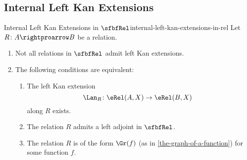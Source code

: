\subsection{Internal Left Kan Extensions}\label{subsection-internal-left-kan-extensions-in-rel}
\begin{proposition}{Internal Left Kan Extensions in $\sfbfRel$}{internal-left-kan-extensions-in-rel}%
    Let $R\colon A\rightproarrow B$ be a relation.
    \begin{enumerate}
        \item\label{internal-left-kan-extensions-in-rel-non-existence-of-all-internal-left-kan-extensions-in-rel}Not all relations in $\sfbfRel$ admit left Kan extensions.
        \item\label{internal-left-kan-extensions-in-rel-characterisation-of-relations-admitting-internal-left-kan-extensions-along-them}The following conditions are equivalent:
            \begin{enumerate}
                \item\label{internal-left-kan-extensions-in-rel-characterisation-of-relations-admitting-internal-left-kan-extensions-along-them-1}The left Kan extension
                    \[
                        \Lan_{R}%
                        \colon%
                        \eRel(A,X)%
                        \to%
                        \eRel(B,X)%
                    \]%
                    along $R$ exists.
                \item\label{internal-left-kan-extensions-in-rel-characterisation-of-relations-admitting-internal-left-kan-extensions-along-them-2}The relation $R$ admits a left adjoint in $\sfbfRel$.
                \item\label{internal-left-kan-extensions-in-rel-characterisation-of-relations-admitting-internal-left-kan-extensions-along-them-3}The relation $R$ is of the form $\Gr(f)$ (as in \cref{the-graph-of-a-function}) for some function $f$.
            \end{enumerate}
    \end{enumerate}
\end{proposition}
